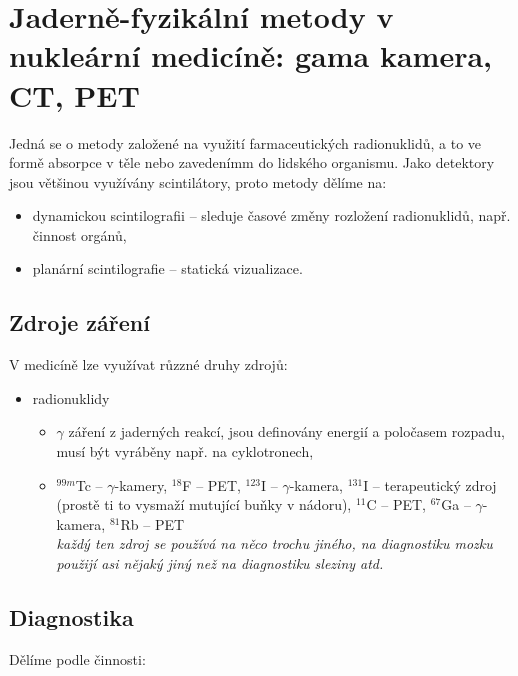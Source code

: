 \section[Jaderně-fyzikální metody v nukleární medicíně]{Jaderně-fyzikální metody v nukleární medicíně: gama kamera, CT, PET}

Jedná se o metody založené na využití farmaceutických radionuklidů, a to ve formě absorpce v těle nebo zavedenímm do lidského organismu. Jako detektory jsou většinou využívány scintilátory, proto metody dělíme na:

\begin{itemize}
    \item dynamickou scintilografii -- sleduje časové změny rozložení radionuklidů, např. činnost orgánů,
    \item planární scintilografie -- statická vizualizace.
\end{itemize}

\subsection{Zdroje záření}

V medicíně lze využívat růzzné druhy zdrojů:

\begin{itemize}
    \item radionuklidy 
    \begin{itemize}
        \item $\gamma$ záření z jaderných reakcí, jsou definovány energií a poločasem rozpadu, musí být vyráběny např. na cyklotronech,
        \item $^{99m}$Tc -- $\gamma$-kamery, $^{18}$F -- PET, $^{123}$I -- $\gamma$-kamera, $^{131}$I -- terapeutický zdroj (prostě ti to vysmaží mutující buňky v nádoru), $^{11}$C -- PET, $^{67}$Ga -- $\gamma$-kamera, $^{81}$Rb -- PET\\
        
        \textit{každý ten zdroj se používá na něco trochu jiného, na diagnostiku mozku použijí asi nějaký jiný než na diagnostiku sleziny atd.}
    \end{itemize}
\end{itemize}

\subsection{Diagnostika}

Dělíme podle činnosti:


